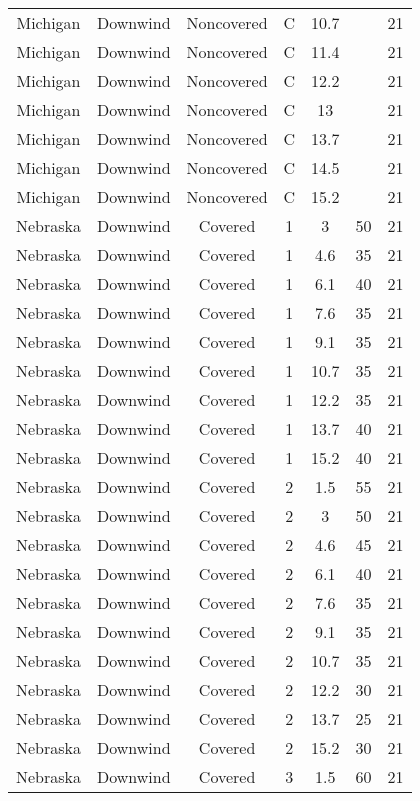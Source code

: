 \documentclass{article}
\begin{document}
\begin{longtable}[H]{ccccccc}
Michigan & Downwind & Noncovered & C & 10.7 &    & 21 \\
Michigan & Downwind & Noncovered & C & 11.4 &    & 21 \\
Michigan & Downwind & Noncovered & C & 12.2 &    & 21 \\
Michigan & Downwind & Noncovered & C & 13   &    & 21 \\
Michigan & Downwind & Noncovered & C & 13.7 &    & 21 \\
Michigan & Downwind & Noncovered & C & 14.5 &    & 21 \\
Michigan & Downwind & Noncovered & C & 15.2 &    & 21 \\
Nebraska & Downwind & Covered     & 1 & 3    & 50 & 21 \\
Nebraska & Downwind & Covered     & 1 & 4.6  & 35 & 21 \\
Nebraska & Downwind & Covered     & 1 & 6.1  & 40 & 21 \\
Nebraska & Downwind & Covered     & 1 & 7.6  & 35 & 21 \\
Nebraska & Downwind & Covered     & 1 & 9.1  & 35 & 21 \\
Nebraska & Downwind & Covered     & 1 & 10.7 & 35 & 21 \\
Nebraska & Downwind & Covered     & 1 & 12.2 & 35 & 21 \\
Nebraska & Downwind & Covered     & 1 & 13.7 & 40 & 21 \\
Nebraska & Downwind & Covered     & 1 & 15.2 & 40 & 21 \\
Nebraska & Downwind & Covered     & 2 & 1.5  & 55 & 21 \\
Nebraska & Downwind & Covered     & 2 & 3    & 50 & 21 \\
Nebraska & Downwind & Covered     & 2 & 4.6  & 45 & 21 \\
Nebraska & Downwind & Covered     & 2 & 6.1  & 40 & 21 \\
Nebraska & Downwind & Covered     & 2 & 7.6  & 35 & 21 \\
Nebraska & Downwind & Covered     & 2 & 9.1  & 35 & 21 \\
Nebraska & Downwind & Covered     & 2 & 10.7 & 35 & 21 \\
Nebraska & Downwind & Covered     & 2 & 12.2 & 30 & 21 \\
Nebraska & Downwind & Covered     & 2 & 13.7 & 25 & 21 \\
Nebraska & Downwind & Covered     & 2 & 15.2 & 30 & 21 \\
Nebraska & Downwind & Covered     & 3 & 1.5  & 60 & 21 \\

\end{longtable}
\end{document}
